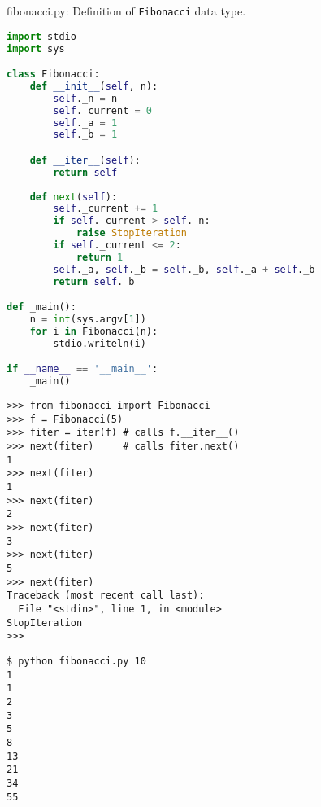 \documentclass[8pt,a4paper,compress]{beamer}
\begin{document}
\begin{frame}[fragile]
\pause

\begin{framed}
\tiny fibonacci.py: Definition of \lstinline{Fibonacci} data type.
\end{framed}

\begin{lstlisting}[language=Python]
import stdio
import sys

class Fibonacci:
    def __init__(self, n):
        self._n = n
        self._current = 0
        self._a = 1
        self._b = 1

    def __iter__(self):
        return self
        
    def next(self):
        self._current += 1
        if self._current > self._n:
            raise StopIteration
        if self._current <= 2:
            return 1
        self._a, self._b = self._b, self._a + self._b
        return self._b

def _main():
    n = int(sys.argv[1])
    for i in Fibonacci(n):
        stdio.writeln(i)

if __name__ == '__main__':
    _main()
\end{lstlisting}
\end{frame}

\begin{frame}[fragile]
\pause

\begin{lstlisting}[language={}]
>>> from fibonacci import Fibonacci
>>> f = Fibonacci(5)
>>> fiter = iter(f) # calls f.__iter__()
>>> next(fiter)     # calls fiter.next()
1
>>> next(fiter)
1
>>> next(fiter)
2
>>> next(fiter)
3
>>> next(fiter)
5
>>> next(fiter)
Traceback (most recent call last):
  File "<stdin>", line 1, in <module>
StopIteration
>>> 
\end{lstlisting}

\pause

\begin{lstlisting}[language={}]
$ python fibonacci.py 10
1
1
2
3
5
8
13
21
34
55
\end{lstlisting}
\end{frame}
\end{document}

